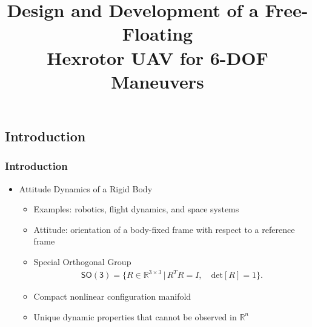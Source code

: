\documentclass[11pt,professionalfonts,hyperref={pdftex,pdfpagemode=none,pdfstartview=FitH}]{beamer}
\title[Design and Development of a Free-Floating Hexrotor UAV for 6-DOF Maneuvers]{\large Design and Development of a Free-Floating\\Hexrotor UAV for 6-DOF Maneuvers}
\author{\vspace*{-0.3cm}}
\institute{\footnotesize
{\normalsize Taeyoung Lee}\vspace*{0.2cm}\\
  Mechanical and Aerospace Engineering\\ George Washington University}
\date{}
\newcommand{\SO}{\ensuremath{\mathsf{SO(3)}}}
\renewcommand{\Re}{\ensuremath{\mathbb{R}}}
\begin{document}
\begin{frame}
  \titlepage
\end{frame}


\section*{}
\subsection*{Introduction}

\begin{frame}
\frametitle{Introduction}
\begin{itemize}
    \item Attitude Dynamics of a Rigid Body
    \begin{itemize}
    	\item Examples: robotics, flight dynamics, and space systems
    	\item Attitude: orientation of a body-fixed frame with respect to a reference frame
		\item Special Orthogonal Group
        \begin{align*}
        \SO = \{ R\in\Re^{3\times 3}\,|\, R^TR=I,\quad\mathrm{det}[R]=1\}.
        \end{align*}
        \item Compact nonlinear configuration manifold
        \item Unique dynamic properties that cannot be observed in $\Re^n$
    \end{itemize}
\end{itemize}


\end{frame}
\end{document}
